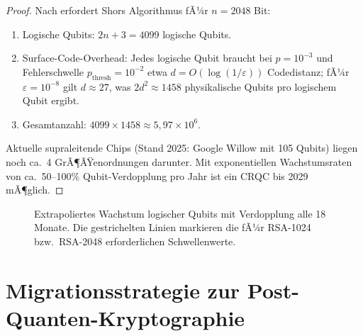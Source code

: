 ﻿\documentclass[a4paper,12pt]{article}
\theoremstyle{definition}
\begin{document}
\begin{proof}
Nach \cite{GE21} erfordert Shors Algorithmus fÃ¼r $n = 2048$ Bit:
\begin{enumerate}
\item Logische Qubits: $2n + 3 = 4099$ logische Qubits.
\item Surface-Code-Overhead: Jedes logische Qubit braucht bei $p = 10^{-3}$
  und Fehlerschwelle $p_\mathrm{thresh} = 10^{-2}$ etwa $d = O(\log(1/\varepsilon))$
  Codedistanz; fÃ¼r $\varepsilon = 10^{-8}$ gilt $d \approx 27$, was
  $2d^2 \approx 1458$ physikalische Qubits pro logischem Qubit ergibt.
\item Gesamtanzahl: $4099 \times 1458 \approx 5{,}97 \times 10^6$.
\end{enumerate}
Aktuelle supraleitende Chips (Stand 2025: Google Willow mit 105 Qubits)
liegen noch ca.\ 4 GrÃ¶ÃŸenordnungen darunter. Mit exponentiellen Wachstumsraten
von ca.\ 50--100\% Qubit-Verdopplung pro Jahr ist ein CRQC bis 2029 mÃ¶glich.
\end{proof}

\begin{figure}[H]
\centering
{}
\caption{Extrapoliertes Wachstum logischer Qubits mit Verdopplung alle 18 Monate. Die gestrichelten Linien markieren die fÃ¼r RSA-1024 bzw.\ RSA-2048 erforderlichen Schwellenwerte.}
\label{fig:qubits}
\end{figure}

\section{Migrationsstrategie zur Post-Quanten-Kryptographie}
\end{document}
